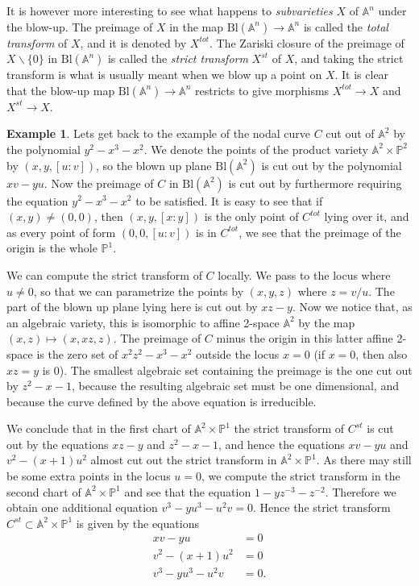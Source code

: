 \documentclass[12pt,a4paper,leqno]{article}
\newcommand{\Aff}{\mathbb{A}}
\newcommand{\Proj}{\mathbb{P}}
\newcommand{\bl}{\mathrm{Bl}}
\theoremstyle{plain}
\theoremstyle{definition}
\newtheorem{ex}[theo]{Example}
\theoremstyle{remark}
\begin{document}
It is however more interesting to see what happens to \emph{subvarieties} $X$ of $\Aff^n$ under the blow-up. The preimage of $X$ in the map $\bl (\Aff^n) \to \Aff^n$ is called the \emph{total transform} of $X$, and it is denoted by $X^{tot}$. The Zariski closure of the preimage of $X \backslash \{ 0 \}$ in $\bl (\Aff^n)$ is called the \emph{strict transform} $X^{st}$ of $X$, and taking the strict transform is what is usually meant when we blow up a point on $X$. It is clear that the blow-up map $\bl (\Aff^n) \to \Aff^n$ restricts to give morphisms $X^{tot} \to X$ and $X^{st} \to X$.

\begin{ex}
Lets get back to the example of the nodal curve $C$ cut out of $\Aff^2$ by the polynomial $y^2 - x^3 - x^2$. We denote the points of the product variety $\Aff^2 \times \Proj^2$ by $(x,y, [u:v])$, so the blown up plane $\bl (\Aff^2)$ is cut out by the polynomial $xv - yu$. Now the preimage of $C$ in $\bl (\Aff^2)$ is cut out by furthermore requiring the equation $y^2 - x^3 - x^2$ to be satisfied. It is easy to see that if $(x,y) \not =  (0,0)$, then $(x,y,[x:y])$ is the only point of $C^{tot}$ lying over it, and as every point of form $(0,0, [u:v])$ is in $C^{tot}$, we see that the preimage of the origin is the whole $\Proj^1$.

We can compute the strict transform of $C$ locally. We pass to the locus where $u \not = 0$, so that we can parametrize the points by $(x,y,z)$ where $z = v/u$. The part of the blown up plane lying here is cut out by $xz - y$. Now we notice that, as an algebraic variety, this is isomorphic to affine 2-space $\Aff^2$ by the map $(x,z) \mapsto (x,xz,z)$. The preimage of $C$ minus the origin in this latter affine 2-space is the zero set of $x^2 z^2 - x^3 - x^2$ outside the locus $x=0$ (if $x=0$, then also $xz=y$ is 0). The smallest algebraic set containing the preimage is the one cut out by $z^2 - x - 1$, because the resulting algebraic set must be one dimensional, and because the curve defined by the above equation is irreducible. 

We conclude that in the first chart of $\Aff^2 \times \Proj^1$ the strict transform of $C^{st}$ is cut out by the equations $xz - y$ and $z^2 - x - 1$, and hence the equations $xv - yu$ and $v^2 - (x+1)u^2$ almost cut out the strict transform in $\Aff^2 \times \Proj^1$. As there may still be some extra points in the locus $u=0$, we compute the strict transform in the second chart of $\Aff^2 \times \Proj^1$ and see that the equation $1 - y z^{-3} - z^{-2}$. Therefore we obtain one additional equation $v^3 - yu^3 - u^2 v = 0$. Hence the strict transform $C^{st} \subset \Aff^2 \times \Proj^1$ is given by the equations
\begin{align*}
xv - yu &= 0 \\
v^2 - (x+1)u^2 &= 0 \\
v^3 - yu^3 - u^2 v &= 0.
\end{align*}
\end{ex}
\end{document}
